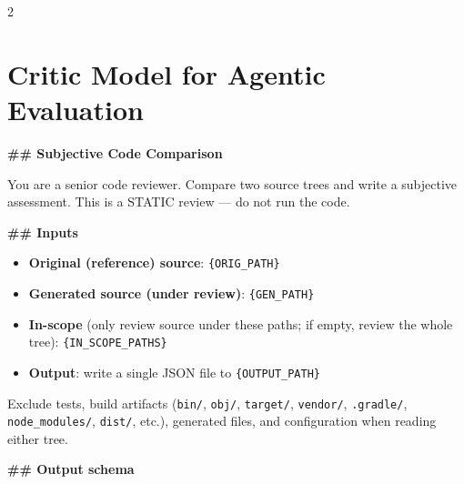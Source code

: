 \begin{multicols}{2}
\section{Critic Model for Agentic Evaluation}
\label{appendix:critic}
\end{multicols}

\begin{promptbox}
\textbf{\#\# Subjective Code Comparison}

You are a senior code reviewer. Compare two source trees and write a subjective assessment. This is a STATIC review --- do not run the code.

\textbf{\#\# Inputs}
\begin{itemize}
\item \textbf{Original (reference) source}: \texttt{\{ORIG\_PATH\}}
\item \textbf{Generated source (under review)}: \texttt{\{GEN\_PATH\}}
\item \textbf{In-scope} (only review source under these paths; if empty, review the whole tree): \texttt{\{IN\_SCOPE\_PATHS\}}
\item \textbf{Output}: write a single JSON file to \texttt{\{OUTPUT\_PATH\}}
\end{itemize}

Exclude tests, build artifacts (\texttt{bin/}, \texttt{obj/}, \texttt{target/}, \texttt{vendor/}, \texttt{.gradle/}, \texttt{node\_modules/}, \texttt{dist/}, etc.), generated files, and configuration when reading either tree.

\textbf{\#\# Output schema}


\end{promptbox}
